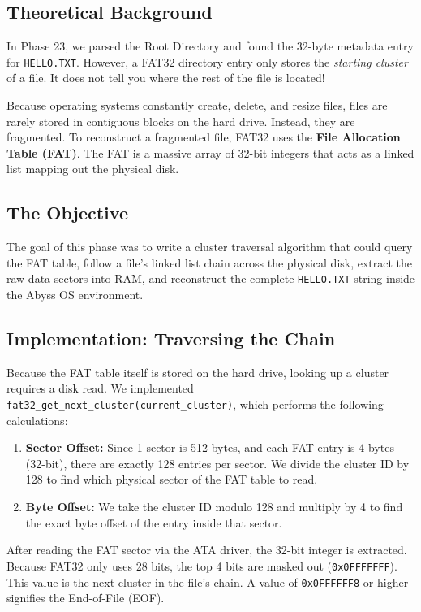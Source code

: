 \documentclass[12pt,a4paper]{report}
\begin{document}
\subsection{Theoretical Background}
In Phase 23, we parsed the Root Directory and found the 32-byte metadata entry for \texttt{HELLO.TXT}. However, a FAT32 directory entry only stores the \textit{starting cluster} of a file. It does not tell you where the rest of the file is located! 

Because operating systems constantly create, delete, and resize files, files are rarely stored in contiguous blocks on the hard drive. Instead, they are fragmented. To reconstruct a fragmented file, FAT32 uses the \textbf{File Allocation Table (FAT)}. The FAT is a massive array of 32-bit integers that acts as a linked list mapping out the physical disk.

\subsection{The Objective}
The goal of this phase was to write a cluster traversal algorithm that could query the FAT table, follow a file's linked list chain across the physical disk, extract the raw data sectors into RAM, and reconstruct the complete \texttt{HELLO.TXT} string inside the Abyss OS environment.

\subsection{Implementation: Traversing the Chain}
Because the FAT table itself is stored on the hard drive, looking up a cluster requires a disk read. We implemented \texttt{fat32\_get\_next\_cluster(current\_cluster)}, which performs the following calculations:
\begin{enumerate}
    \item \textbf{Sector Offset:} Since 1 sector is 512 bytes, and each FAT entry is 4 bytes (32-bit), there are exactly 128 entries per sector. We divide the cluster ID by 128 to find which physical sector of the FAT table to read.
    \item \textbf{Byte Offset:} We take the cluster ID modulo 128 and multiply by 4 to find the exact byte offset of the entry inside that sector.
\end{enumerate}

After reading the FAT sector via the ATA driver, the 32-bit integer is extracted. Because FAT32 only uses 28 bits, the top 4 bits are masked out (\texttt{0x0FFFFFFF}). This value is the next cluster in the file's chain. A value of \texttt{0x0FFFFFF8} or higher signifies the End-of-File (EOF).
\end{document}
